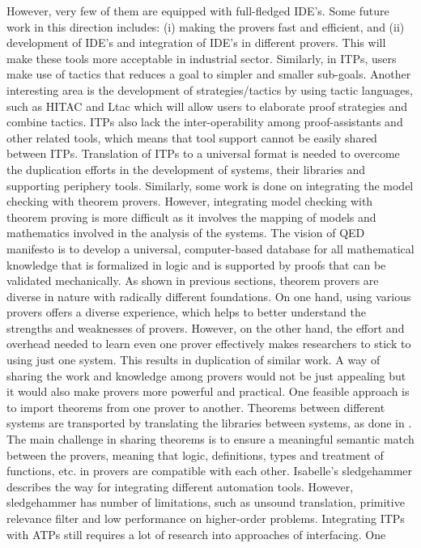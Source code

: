 However, very few of them are equipped with full-fledged IDE's.
Some future work in this direction includes: (i) making the provers fast and efficient, and (ii) development of IDE's and integration
of IDE's in different provers. This will make these tools more acceptable in industrial sector. 
Similarly, in ITPs, users make use of tactics that reduces a goal to simpler and smaller sub-goals. 
Another interesting area is the development of strategies/tactics by using
tactic languages, such as HITAC  and Ltac  which will allow users 
to elaborate proof strategies and combine tactics.
ITPs also lack the inter-operability among proof-assistants and other related tools, which means that tool support cannot be easily shared between ITPs. 
Translation of ITPs to a universal format is needed to overcome the duplication efforts
in the development of systems, their libraries and supporting periphery tools. Similarly,
some work  is done on integrating the model checking with theorem provers. 
However, integrating model checking with theorem proving is more difficult as it involves 
the mapping of models and mathematics involved in the analysis of the systems. 
The vision of QED manifesto is to develop a universal, computer-based database for all mathematical knowledge that is formalized
in logic and is supported by proofs that can be validated mechanically.
As shown in previous sections, theorem provers are diverse in nature with radically different foundations. 
On one hand, using various provers offers a diverse experience, which helps to better understand
the strengths and weaknesses of provers. However, on the other hand, the effort and overhead needed to learn even one prover 
effectively makes researchers to stick to using just one system. This results in duplication of similar work. 
A way of sharing the work and knowledge among provers would not be just appealing but it would also make 
provers more powerful and practical. One feasible approach is to import theorems from one prover to another.
Theorems between different systems are transported by translating the libraries between systems, as done in .
The main challenge in sharing theorems is to ensure a meaningful semantic match between the provers, meaning that logic, definitions, types and
treatment of functions, etc. in provers are compatible with each other.
Isabelle's sledgehammer  describes the way for integrating different automation tools.
However, sledgehammer has number of limitations, such as unsound translation, primitive relevance filter and low performance on 
higher-order problems. Integrating ITPs with ATPs still requires a lot of research into approaches of interfacing. One
